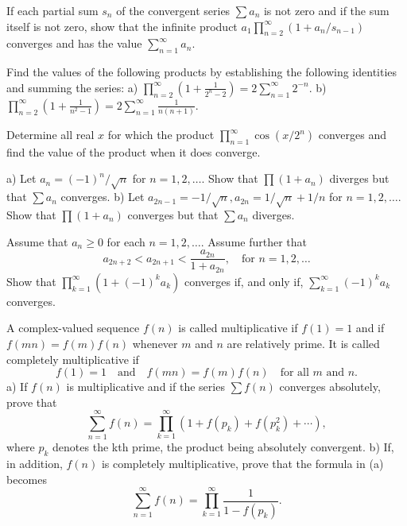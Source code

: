 \begin{problembox}
If each partial sum \(s_n\) of the convergent series \(\sum a_n\) is not zero and if the sum itself is not zero, show that the infinite product \(a_1 \prod_{n=2}^{\infty} (1 + a_n / s_{n-1})\) converges and has the value \(\sum_{n=1}^{\infty} a_n\).
\end{problembox}

\begin{problembox}
Find the values of the following products by establishing the following identities and summing the series:
a) \(\prod_{n=2}^{\infty} \left( 1 + \frac{1}{2^n - 2} \right) = 2 \sum_{n=1}^{\infty} 2^{-n}\).
b) \(\prod_{n=2}^{\infty} \left( 1 + \frac{1}{n^2 - 1} \right) = 2 \sum_{n=1}^{\infty} \frac{1}{n(n+1)}\).
\end{problembox}

\begin{problembox}
Determine all real \(x\) for which the product \(\prod_{n=1}^{\infty} \cos (x/2^n)\) converges and find the value of the product when it does converge.
\end{problembox}

\begin{problembox}
a) Let \(a_n = (-1)^n/\sqrt{n}\) for \(n = 1, 2, \ldots\). Show that \(\prod (1 + a_n)\) diverges but that \(\sum a_n\) converges.
b) Let \(a_{2n-1} = -1/\sqrt{n}, a_{2n} = 1/\sqrt{n} + 1/n\) for \(n = 1, 2, \ldots\). Show that \(\prod (1 + a_n)\) converges but that \(\sum a_n\) diverges.
\end{problembox}

\begin{problembox}
Assume that \(a_n \geq 0\) for each \(n = 1, 2, \ldots\). Assume further that
\[a_{2n+2} < a_{2n+1} < \frac{a_{2n}}{1 + a_{2n}}, \quad \text{for } n = 1, 2, \ldots\]
Show that \(\prod_{k=1}^{\infty} (1 + (-1)^k a_k)\) converges if, and only if, \(\sum_{k=1}^{\infty} (-1)^k a_k\) converges.
\end{problembox}

\begin{problembox}
A complex-valued sequence \(f(n)\) is called multiplicative if \(f(1) = 1\) and if \(f(mn) = f(m)f(n)\) whenever \(m\) and \(n\) are relatively prime. It is called completely multiplicative if
\[f(1) = 1 \quad \text{and} \quad f(mn) = f(m)f(n) \quad \text{for all } m \text{ and } n.\]
a) If \(f(n)\) is multiplicative and if the series \(\sum f(n)\) converges absolutely, prove that
\[\sum_{n=1}^{\infty} f(n) = \prod_{k=1}^{\infty} (1 + f(p_k) + f(p_k^2) + \cdots),\]
where \(p_k\) denotes the kth prime, the product being absolutely convergent.
b) If, in addition, \(f(n)\) is completely multiplicative, prove that the formula in (a) becomes
\[\sum_{n=1}^{\infty} f(n) = \prod_{k=1}^{\infty} \frac{1}{1 - f(p_k)}.\]
\end{problembox}

